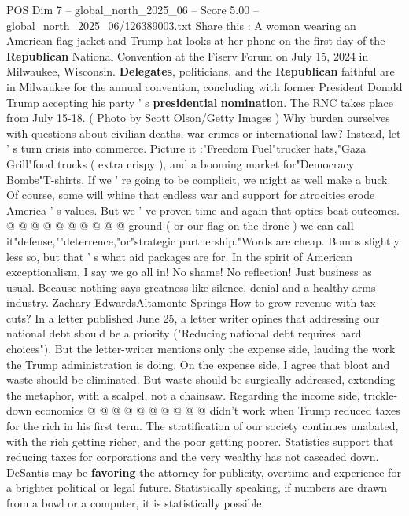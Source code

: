 \begin{textsample}{POS Dim 7 – global\_north\_2025\_06 – Score 5.00 – global\_north\_2025\_06/126389003.txt}  \label{ex:f7_pos_382}
Share this : A woman wearing an American flag jacket and Trump hat looks at her phone on the first day of the \textbf{Republican} National Convention at the Fiserv Forum on July 15, 2024 in Milwaukee, Wisconsin. \textbf{Delegates}, politicians, and the \textbf{Republican} faithful are in Milwaukee for the annual convention, concluding with former President Donald Trump accepting his party ' s \textbf{presidential} \textbf{nomination}.
The RNC takes place from July 15-18. ( Photo by Scott Olson/Getty Images ) Why burden ourselves with questions about civilian deaths, war crimes or international law?
Instead, let ' s turn crisis into commerce.
Picture it :"Freedom Fuel"trucker hats,"Gaza Grill"food trucks ( extra crispy ), and a booming market for"Democracy Bombs"T-shirts.
If we ' re going to be complicit, we might as well make a buck.
Of course, some will whine that endless war and support for atrocities erode America ' s values.
But we ' ve proven time and again that optics beat outcomes. @ @ @ @ @ @ @ @ @ @ ground ( or our flag on the drone ) we can call it"defense,""deterrence,"or"strategic partnership."Words are cheap.
Bombs slightly less so, but that ' s what aid packages are for.
In the spirit of American exceptionalism, I say we go all in!
No shame!
No reflection!
Just business as usual.
Because nothing says greatness like silence, denial and a healthy arms industry.
Zachary EdwardsAltamonte Springs How to grow revenue with tax cuts?
In a letter published June 25, a letter writer opines that addressing our national debt should be a priority ("Reducing national debt requires hard choices").
But the letter-writer mentions only the expense side, lauding the work the Trump administration is doing.
On the expense side, I agree that bloat and waste should be eliminated.
But waste should be surgically addressed, extending the metaphor, with a scalpel, not a chainsaw.
Regarding the income side, trickle-down economics @ @ @ @ @ @ @ @ @ @ didn't work when Trump reduced taxes for the rich in his first term.
The stratification of our society continues unabated, with the rich getting richer, and the poor getting poorer.
Statistics support that reducing taxes for corporations and the very wealthy has not cascaded down.
DeSantis may be \textbf{favoring} the attorney for publicity, overtime and experience for a brighter political or legal future.
Statistically speaking, if numbers are drawn from a bowl or a computer, it is statistically possible.

\end{textsample}
